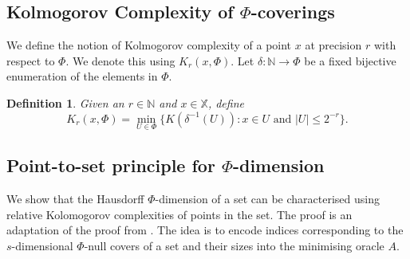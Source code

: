\documentclass[11pt]{article}
\newtheorem{definition}{Definition}
\newcommand{\N}{\mathbb{N}}
\newcommand{\X}{{\mathbb{X}}}
\newcommand{\U}{U}
\newcommand{\x}{x}
\begin{document}
\subsection{Kolmogorov Complexity of $\Phi$-coverings}
We define the notion of Kolmogorov complexity of a point $x$ at precision $r$ with respect to $\Phi$. We denote this using $K_r(x,\Phi)$.
Let $\delta : \N \to \Phi$ be a fixed bijective enumeration of the elements in $\Phi$.

\begin{definition}
	Given an $r \in \N$ and $\x \in \X$, define 
	$$K_r(\x, \Phi) =\min_{U \in \Phi} \{K(\delta^{-1}(U)) : \x \in \U \text{ and } |U| \leq 2^{-r}\}.$$
\end{definition}

\subsection{{Point-to-set principle for $\Phi$-dimension} }

We show that the Hausdorff $\Phi$-dimension of a set can be characterised using 
relative Kolomogorov complexities of points in the set.
The proof is an adaptation of the proof from \cite{Lutz2018}. The idea is to encode indices corresponding to the $s$-dimensional $\Phi$-null covers of a set and their sizes  into the minimising oracle $A$.
\end{document}
